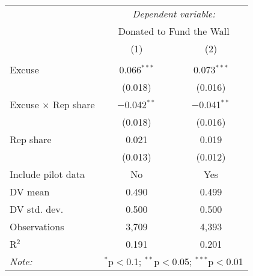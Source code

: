 
\begin{table}[!htbp] \centering 
  \label{t:2-cityheterogeneity-slides} 
\begin{tabular}{@{\hspace{5pt}}l@{\hspace{5pt}}cc} 
\toprule 
 & \multicolumn{2}{c}{\textit{Dependent variable:}} \\ 
\cmidrule(rr){2-3} 
 & \multicolumn{2}{c}{Donated to Fund the Wall} \\ 
 \cmidrule(rr){2-3}
 & (1) & (2)\\ 
\midrule  
\\[-2.1ex] Excuse & 0.066$^{***}$ & 0.073$^{***}$ \\ 
  & (0.018) & (0.016) \\ 
 \addlinespace 
 Excuse $\times$ Rep share & $-$0.042$^{**}$ & $-$0.041$^{**}$ \\ 
  & (0.018) & (0.016) \\ 
 \addlinespace 
 Rep share & 0.021 & 0.019 \\ 
  & (0.013) & (0.012) \\ 
 \addlinespace 
\midrule  
\midrule
Include pilot data & No & Yes \\
DV mean & 0.490 & 0.499 \\
DV std. dev. & 0.500 & 0.500 \\
Observations & 3,709 & 4,393 \\ 
R$^{2}$ & 0.191 & 0.201 \\ 
\bottomrule 
\textit{Note:}  & \multicolumn{2}{r}{$^{*}$p$<$0.1; $^{**}$p$<$0.05; $^{***}$p$<$0.01} \\ 
\end{tabular} 
\end{table} 
